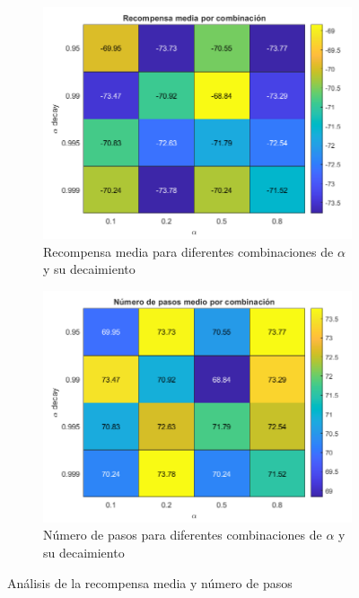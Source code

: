 \begin{figure}[H]
    \centering
    \begin{subfigure}{0.7\textwidth}
        \centering
        \includegraphics[width=\textwidth]{../../experiments/qlearning/experiment-3/results/reward.png}
        \caption{Recompensa media para diferentes combinaciones de $\alpha$ y su decaimiento}
        \label{fig:qlearning-subfig-reward}
    \end{subfigure}
    \hfill
    \begin{subfigure}{0.7\textwidth}
        \centering
        \includegraphics[width=\textwidth]{../../experiments/qlearning/experiment-3/results/steps.png}
        \caption{Número de pasos para diferentes combinaciones de $\alpha$ y su decaimiento}
        \label{fig:qlearning-subfig-steps}
    \end{subfigure}
    \caption{Análisis de la recompensa media y número de pasos}
    \label{fig:qlearning-reward}
\end{figure}

